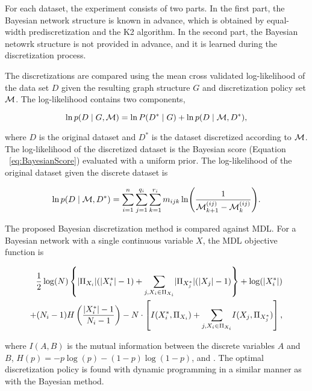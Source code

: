 For each dataset, the experiment consists of two parts.
In the first part, the Bayesian network structure is known in advance, which is obtained by equal-width prediscretization and the K2 algorithm.
In the second part, the Bayesian netowrk structure is not provided in advance, and it is learned during the discretization process.

The discretizations are compared using the mean cross validated log-likelihood of the data set $D$ given the resulting graph structure $G$ and discretization policy set $\mathcal{M}$.
The log-likelihood contains two components,

\begin{equation}
\ln p(D\mid G, \mathcal{M}) = \ln P(D^*\mid G) + \ln p(D\mid \mathcal{M}, D^*)\text{,}
\end{equation}

\noindent
where $D$ is the original dataset and $D^*$ is the dataset discretized according to $\mathcal{M}$.
The log-likelihood of the discretized dataset is the Bayesian score (Equation ~\ref{eq:BayesianScore}) evaluated with a uniform prior.
The log-likelihood of the original dataset given the discrete dataset is

\begin{equation}
  \ln p(D\mid \discset, D^*) = \sum_{i=1}^n \sum_{j=1}^{q_i} \sum_{k=1}^{r_i} m_{ijk} \ln\paren{
    \frac{
      1
    }{
      \discset^{(ij)}_{k+1} - \discset^{(ij)}_{k}
    }
  }\text{.}
\end{equation}

The proposed Bayesian discretization method is compared against MDL.
For a Bayesian network with a single continuous variable $X$, the MDL objective function is

\begin{equation}
\label{eqn:MDL}
\begin{aligned}
\frac{1}{2} \log(N) \left\lbrace  \lvert \Pi_{X_i} \rvert (\lvert X^*_i \rvert - 1) +
 {\sum_{j,X_i \in \Pi_{X_i}}} \lvert \Pi_{X^*_j} \rvert (\lvert X_j \rvert - 1) \right\rbrace + \log(\lvert {X^*_i} \rvert) \\
 + (N_i-1) H \left( {{|X^*_i| - 1}\over{N_i -1}}  \right) -N \cdot \left[ I(X^*_i,\Pi_{X_i}) + {\sum_{j,X_i \in \Pi_{X_i}}} I(X_j, \Pi_{X^*_j}) \right]\text{,}
\end{aligned}
\end{equation}

where $I(A,B)$ is the mutual information between the discrete variables $A$ and $B$, ${H(p) = -p \log(p) - (1-p) \log(1-p)}$, and .
The optimal discretization policy is found with dynamic programming in a similar manner as with the Bayesian method.


